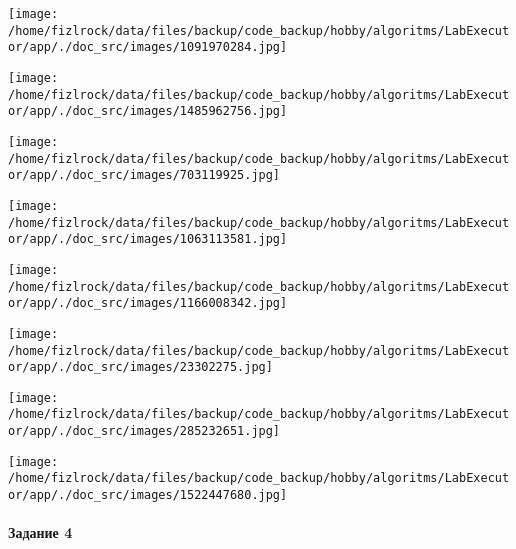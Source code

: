 \documentclass[a4paper, 12pt]{article}
\begin{document}
\texttt{[image: /home/fizlrock/data/files/backup/code\_backup/hobby/algoritms/LabExecutor/app/./doc\_src/images/1091970284.jpg]}

\texttt{[image: /home/fizlrock/data/files/backup/code\_backup/hobby/algoritms/LabExecutor/app/./doc\_src/images/1485962756.jpg]}

\texttt{[image: /home/fizlrock/data/files/backup/code\_backup/hobby/algoritms/LabExecutor/app/./doc\_src/images/703119925.jpg]}

\texttt{[image: /home/fizlrock/data/files/backup/code\_backup/hobby/algoritms/LabExecutor/app/./doc\_src/images/1063113581.jpg]}

\texttt{[image: /home/fizlrock/data/files/backup/code\_backup/hobby/algoritms/LabExecutor/app/./doc\_src/images/1166008342.jpg]}

\texttt{[image: /home/fizlrock/data/files/backup/code\_backup/hobby/algoritms/LabExecutor/app/./doc\_src/images/23302275.jpg]}

\texttt{[image: /home/fizlrock/data/files/backup/code\_backup/hobby/algoritms/LabExecutor/app/./doc\_src/images/285232651.jpg]}

\texttt{[image: /home/fizlrock/data/files/backup/code\_backup/hobby/algoritms/LabExecutor/app/./doc\_src/images/1522447680.jpg]}
\pagebreak
\paragraph{Задание 4}
\end{document}
